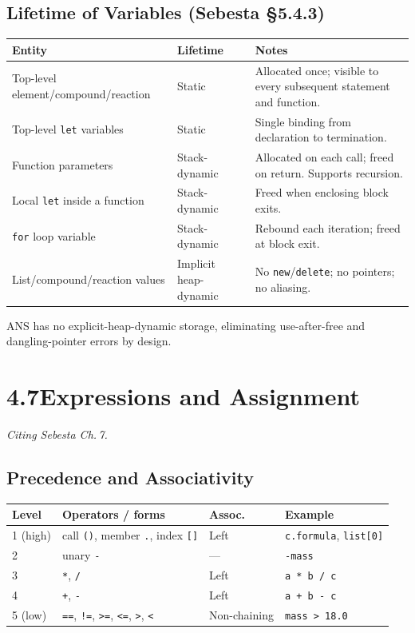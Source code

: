 \documentclass[11pt,a4paper]{article}
\newcommand{\code}[1]{\texttt{#1}}
\begin{document}
\subsection{Lifetime of Variables (Sebesta \S5.4.3)}
\begin{tabularx}{\textwidth}{@{} L{4.5cm} L{2.8cm} Y @{}}
\toprule
\textbf{Entity} & \textbf{Lifetime} & \textbf{Notes} \\
\midrule
Top-level element/compound/reaction & Static & Allocated once; visible to every subsequent statement and function. \\
Top-level \code{let} variables & Static & Single binding from declaration to termination. \\
Function parameters & Stack-dynamic & Allocated on each call; freed on return. Supports recursion. \\
Local \code{let} inside a function & Stack-dynamic & Freed when enclosing block exits. \\
\code{for} loop variable & Stack-dynamic & Rebound each iteration; freed at block exit. \\
List/compound/reaction values & Implicit heap-dynamic & No \code{new}/\code{delete}; no pointers; no aliasing. \\
\bottomrule
\end{tabularx}

ANS has no explicit-heap-dynamic storage, eliminating use-after-free and dangling-pointer errors by design.

\section{4.7\quad Expressions and Assignment}
\textit{Citing Sebesta Ch.\,7.}

\subsection{Precedence and Associativity}

\begin{tabularx}{\textwidth}{@{} L{1.4cm} L{4.0cm} L{2.0cm} Y @{}}
\toprule
\textbf{Level} & \textbf{Operators / forms} & \textbf{Assoc.} & \textbf{Example} \\
 (high) & call \code{()}, member \code{.}, index \code{[]} & Left & \code{c.formula}, \code{list[0]} \\
2 & unary \code{-}              & --- & \code{-mass} \\
3 & \code{*}, \code{/}          & Left & \code{a * b / c} \\
4 & \code{+}, \code{-}          & Left & \code{a + b - c} \\
5 (low) & \code{==}, \code{!=}, \code{>=}, \code{<=}, \code{>}, \code{<} & Non-chaining & \code{mass > 18.0} \\
\bottomrule
\end{tabularx}
\end{document}
